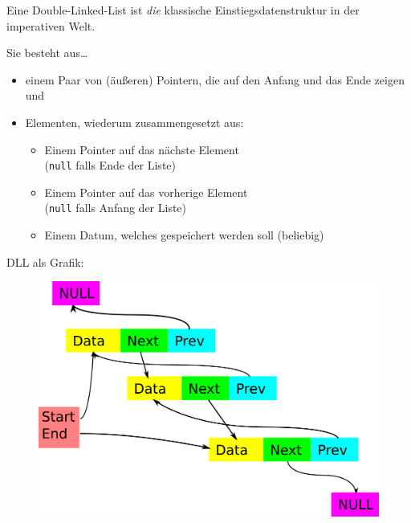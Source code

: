 \documentclass{beamer}
\begin{document}
\begin{frame}
Eine Double-Linked-List ist \emph{die} klassische Einstiegsdatenstruktur in der imperativen Welt.\\
\pause\bigskip

Sie besteht aus\dots

\begin{itemize}
 \item einem Paar von (äußeren) Pointern, die auf den Anfang und das Ende zeigen und
 \pause
 \item Elementen, wiederum zusammengesetzt aus:
 \pause
 \begin{itemize}
  \item Einem Pointer auf das nächste Element\\ (\texttt{null} falls Ende der Liste)
  \pause
  \item Einem Pointer auf das vorherige Element\\ (\texttt{null} falls Anfang der Liste)
  \pause
  \item Einem Datum, welches gespeichert werden soll (beliebig)
 \end{itemize}

\end{itemize}

\end{frame}

\begin{frame}
DLL als Grafik:
\begin{figure}[h]
\includegraphics{dll.png}
\end{figure}

\end{frame}
\end{document}
